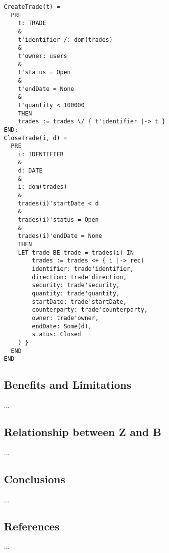 \documentclass{article}
\begin{document}
\begin{lstlisting}
CreateTrade(t) =
  PRE
    t: TRADE
    &
    t'identifier /: dom(trades)
    &
    t'owner: users 
    &
    t'status = Open 
    &
    t'endDate = None 
    &
    t'quantity < 100000
    THEN
    trades := trades \/ { t'identifier |-> t }
END;
CloseTrade(i, d) =
  PRE
    i: IDENTIFIER
    &
    d: DATE
    &
    i: dom(trades)
    &
    trades(i)'startDate < d
    &
    trades(i)'status = Open
    &
    trades(i)'endDate = None
    THEN
    LET trade BE trade = trades(i) IN
        trades := trades <+ { i |-> rec( 
        identifier: trade'identifier, 
        direction: trade'direction, 
        security: trade'security, 
        quantity: trade'quantity, 
        startDate: trade'startDate, 
        counterparty: trade'counterparty,
        owner: trade'owner,
        endDate: Some(d), 
        status: Closed
    ) }
  END
END 
\end{lstlisting}

\pagebreak

\subsection*{Benefits and Limitations}

... \pagebreak

\subsection*{Relationship between Z and B}

... \pagebreak

\subsection*{Conclusions}

... \pagebreak

\subsection*{References}

...
\end{document}

